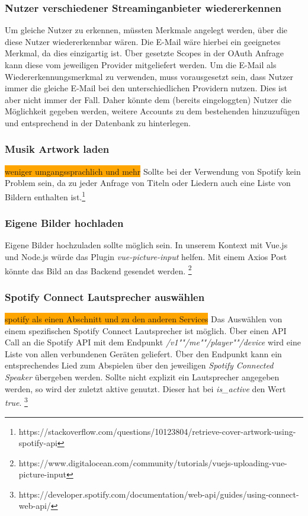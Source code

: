 \documentclass[10pt, a4paper]{article}
\begin{document}
\begin{onehalfspace}
\subsubsection{Nutzer verschiedener Streaminganbieter wiedererkennen}
Um gleiche Nutzer zu erkennen, müssten Merkmale angelegt werden, über die diese Nutzer wiedererkennbar wären.
Die E-Mail wäre hierbei ein geeignetes Merkmal, da dies einzigartig ist. Über gesetzte Scopes in der OAuth Anfrage kann diese vom jeweiligen Provider mitgeliefert werden.
Um die E-Mail als Wiedererkennungsmerkmal zu verwenden, muss vorausgesetzt sein, dass Nutzer immer die gleiche E-Mail bei den unterschiedlichen Providern nutzen. Dies ist aber nicht immer der Fall.
Daher könnte dem (bereits eingeloggten) Nutzer die Möglichkeit gegeben werden, weitere Accounts zu dem bestehenden hinzuzufügen und entsprechend in der Datenbank zu hinterlegen.

\subsubsection{Musik Artwork laden}
\colorbox{orange}{weniger umgangssprachlich und mehr}
Sollte bei der Verwendung von Spotify kein Problem sein, da zu jeder Anfrage von Titeln oder Liedern auch eine Liste von Bildern enthalten ist.\footnote{https://stackoverflow.com/questions/10123804/retrieve-cover-artwork-using-spotify-api}

\subsubsection{Eigene Bilder hochladen}
Eigene Bilder hochzuladen sollte möglich sein. In unserem Kontext mit Vue.js und Node.js würde das Plugin \textit{vue-picture-input} helfen.
Mit einem Axios Post könnte das Bild an das Backend gesendet werden. \footnote{https://www.digitalocean.com/community/tutorials/vuejs-uploading-vue-picture-input}

\subsubsection{Spotify Connect Lautsprecher auswählen}
\colorbox{orange}{spotify als einen Abschnitt und zu den anderen Services}
Das Auswählen von einem spezifischen Spotify Connect Lautsprecher ist möglich.
Über einen API Call an die Spotify API mit dem Endpunkt \textit{/v1""/me""/player""/device} wird eine Liste von allen verbundenen Geräten geliefert. Über den Endpunkt kann ein entsprechendes Lied zum Abspielen über den jeweiligen \textit{Spotify Connected Speaker} übergeben werden.
Sollte nicht explizit ein Lautsprecher angegeben werden, so wird der zuletzt aktive genutzt. Dieser hat bei \textit{is\_active} den Wert \textit{true}. \footnote{https://developer.spotify.com/documentation/web-api/guides/using-connect-web-api/}


\end{onehalfspace}
\end{document}
